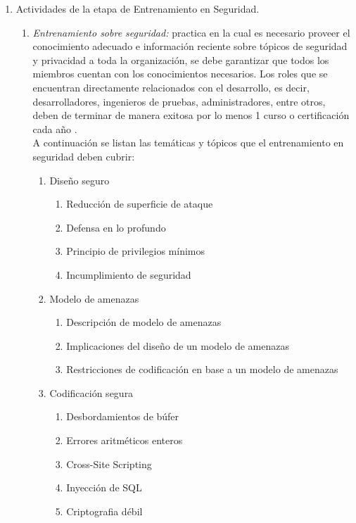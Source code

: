\documentclass[runningheads,a4paper]{llncs}
\begin{document}
\begin{enumerate}
\item Actividades de la etapa de Entrenamiento en Seguridad.
\\
\begin{enumerate}

\item \textit{Entrenamiento sobre seguridad: }practica en la cual es necesario  proveer el conocimiento adecuado e información reciente sobre tópicos de seguridad y privacidad a toda la organización, se debe garantizar que todos los miembros cuentan con los conocimientos necesarios. Los roles que se encuentran directamente relacionados con el desarrollo, es decir, desarrolladores, ingenieros de pruebas, administradores, entre otros, deben de terminar de manera exitosa por lo menos 1 curso o certificación cada año \cite{SDLWhitePaper}. \\

A continuación se listan las temáticas y tópicos que el entrenamiento en seguridad deben cubrir:\\

\begin{enumerate}
\item Diseño seguro
	\begin{enumerate}
		\item Reducción de superficie de ataque
		\item Defensa en lo profundo
		\item Principio de privilegios mínimos
		\item Incumplimiento de seguridad\\
		
	\end{enumerate}
\item Modelo de amenazas
	\begin{enumerate}
		\item Descripción de modelo de amenazas	
		\item Implicaciones del diseño de un modelo de amenazas
		\item Restricciones de codificación en base a un modelo de amenazas\\
		
	\end{enumerate}
\item Codificación segura
	\begin{enumerate}
		\item Desbordamientos de búfer	
		\item Errores aritméticos enteros
		\item \gls{Cross-Site Scripting}	
		\item Inyección de \gls{SQL}
		\item \gls{Criptografia} débil\\
		

\end{enumerate}
\end{enumerate}
\end{enumerate}
\end{enumerate}
\end{document}
